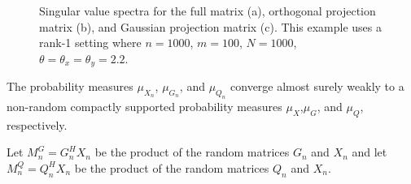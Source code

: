 \begin{figure}
\begin{center}
  \caption{Singular value spectra for the full matrix (a), orthogonal projection matrix
    (b), and Gaussian projection matrix (c). This example uses a rank-1
    setting where $n=1000$, $m=100$, $N=1000$, $\theta=\theta_x=\theta_y=2.2$.}
  \label{fig:chpt7:motivation2}
\end{center}
\end{figure}

\begin{Assum}\label{assum:x_limit}
The probability measures $\mu_{X_n}$, $\mu_{G_n}$, and $\mu_{Q_n}$ converge almost surely
weakly to a non-random compactly supported probability measures $\mu_X$,$\mu_G$, and
$\mu_Q$, respectively.  
\end{Assum}

\begin{Def}
Let $M_n^G = G_n^HX_n$ be the product of the random matrices $G_n$ and $X_n$ and let
$M_n^Q=Q_n^HX_n$ be the product of the random matrices $Q_n$ and $X_n$.
\end{Def}

